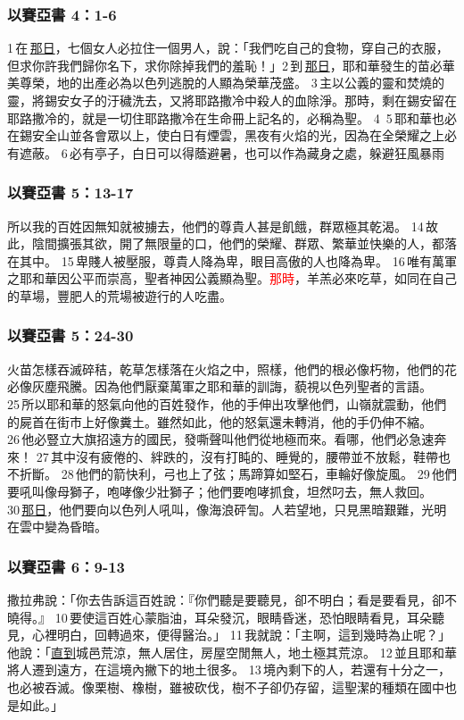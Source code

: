 \subsubsection{以賽亞書 4：1-6}
1 在 \underline{那日}，七個女人必拉住一個男人，說：「我們吃自己的食物，穿自己的衣服，但求你許我們歸你名下，求你除掉我們的羞恥！」2 到 \underline{那日}，耶和華發生的苗必華美尊榮，地的出產必為以色列逃脫的人顯為榮華茂盛。 3 主以公義的靈和焚燒的靈，將錫安女子的汙穢洗去，又將耶路撒冷中殺人的血除淨。那時，剩在錫安留在耶路撒冷的，就是一切住耶路撒冷在生命冊上記名的，必稱為聖。 4  5 耶和華也必在錫安全山並各會眾以上，使白日有煙雲，黑夜有火焰的光，因為在全榮耀之上必有遮蔽。 6 必有亭子，白日可以得蔭避暑，也可以作為藏身之處，躲避狂風暴雨

\subsubsection{以賽亞書 5：13-17}
所以我的百姓因無知就被擄去，他們的尊貴人甚是飢餓，群眾極其乾渴。 14 故此，陰間擴張其欲，開了無限量的口，他們的榮耀、群眾、繁華並快樂的人，都落在其中。 15 卑賤人被壓服，尊貴人降為卑，眼目高傲的人也降為卑。 16 唯有萬軍之耶和華因公平而崇高，聖者神因公義顯為聖。\textcolor{red}{那時}，羊羔必來吃草，如同在自己的草場，豐肥人的荒場被遊行的人吃盡。

\subsubsection{以賽亞書 5：24-30}
火苗怎樣吞滅碎秸，乾草怎樣落在火焰之中，照樣，他們的根必像朽物，他們的花必像灰塵飛騰。因為他們厭棄萬軍之耶和華的訓誨，藐視以色列聖者的言語。 25 所以耶和華的怒氣向他的百姓發作，他的手伸出攻擊他們，山嶺就震動，他們的屍首在街市上好像糞土。雖然如此，他的怒氣還未轉消，他的手仍伸不縮。26 他必豎立大旗招遠方的國民，發嘶聲叫他們從地極而來。看哪，他們必急速奔來！ 27 其中沒有疲倦的、絆跌的，沒有打盹的、睡覺的，腰帶並不放鬆，鞋帶也不折斷。 28 他們的箭快利，弓也上了弦；馬蹄算如堅石，車輪好像旋風。 29 他們要吼叫像母獅子，咆哮像少壯獅子；他們要咆哮抓食，坦然叼去，無人救回。 30 \underline{那日}，他們要向以色列人吼叫，像海浪砰訇。人若望地，只見黑暗艱難，光明在雲中變為昏暗。

\subsubsection{以賽亞書 6：9-13}
撒拉弗說：「你去告訴這百姓說：『你們聽是要聽見，卻不明白；看是要看見，卻不曉得。』 10 要使這百姓心蒙脂油，耳朵發沉，眼睛昏迷，恐怕眼睛看見，耳朵聽見，心裡明白，回轉過來，便得醫治。」 11 我就說：「主啊，這到幾時為止呢？」他說：「\underline{直到}城邑荒涼，無人居住，房屋空閒無人，地土極其荒涼。 12 並且耶和華將人遷到遠方，在這境內撇下的地土很多。 13 境內剩下的人，若還有十分之一，也必被吞滅。像栗樹、橡樹，雖被砍伐，樹不子卻仍存留，這聖潔的種類在國中也是如此。」

